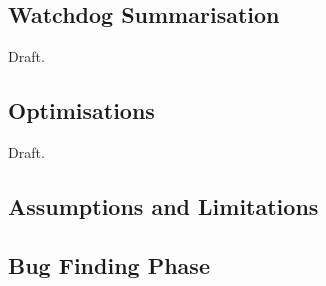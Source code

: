 \subsection{Watchdog Summarisation}
\label{summarisation}

Draft.

\subsection{Optimisations}
\label{optimisations}

Draft.

\subsection{Assumptions and Limitations}
\label{limitations}

\subsection{Bug Finding Phase}
\label{tech:bugfinding}


